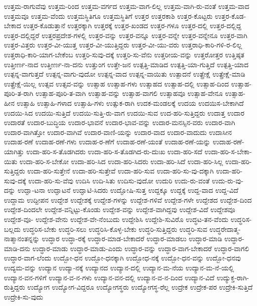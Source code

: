 {ಉತ್ತಮ-ರಾಗುವೆವು
ಉತ್ತಮ-ರಿಂದ
ಉತ್ತಮ-ವರ್ಗದ
ಉತ್ತಮ-ವಾಗ-ಲಿಲ್ಲ
ಉತ್ತಮ-ವಾಗಿ-ರು-ವಂತೆ
ಉತ್ತಮ-ವಾದ
ಉತ್ತಮವೂ
ಉತ್ತಮ-ವೆಂದು
ಉತ್ತಮಸ್ಥಿತಿಗೂ
ಉತ್ತಮಸ್ಥಿತಿಗೆ
ಉತ್ತರ
ಉತ್ತರಕಾಶಿ
ಉತ್ತರ-ಕೊಟ್ಟರು
ಉತ್ತರ-ಕೊಡ-ಬೇಕಾದ
ಉತ್ತರ-ಕೊಡುತ್ತಾನೆ
ಉತ್ತರಕ್ಕಾಗಿ
ಉತ್ತರಕ್ಕೆ
ಉತ್ತರ-ಖಂಡದ
ಉತ್ತರ-ಗಳೂ
ಉತ್ತರ-ದಲ್ಲಿ
ಉತ್ತರ-ದಲ್ಲಿದ್ದ
ಉತ್ತರ-ದಲ್ಲಿದ್ದರೆ
ಉತ್ತರಪ್ರದೇಶ-ಗಳಲ್ಲಿ
ಉತ್ತರ-ವನ್ನು
ಉತ್ತರ-ವನ್ನೂ
ಉತ್ತರ-ವನ್ನೇ
ಉತ್ತರ-ವನ್ನೇನೂ
ಉತ್ತರ-ವಾಗಿ
ಉತ್ತರ-ವಿತ್ತರು
ಉತ್ತರ-ವೀ-ಯುತ್ತ
ಉತ್ತರ-ವೀ-ಯುತ್ತಿದ್ದರು
ಉತ್ತರ-ವೀ-ಯು-ವರು
ಉತ್ತರಾಧಿ-ಕಾರಿ-ಗಳಿ-ರ-ಲಿಲ್ಲ
ಉತ್ತರಾಧಿ-ಕಾರಿ-ಯಾಗ-ಬೇಕೆಂಬ
ಉತ್ತರಿ-ಸುವು-ದಕ್ಕೆ
ಉತ್ತರಿ-ಸು-ವೆನು
ಉತ್ತರೀಯ-ವನ್ನು
ಉತ್ತರೋತ್ತರ
ಉತ್ತಿಷ್ಠತ
ಉತ್ತೀರ್ಣ-ನಾದ
ಉತ್ತೀರ್ಣ-ನಾ-ದನು
ಉತ್ತುಂಗ
ಉತ್ತೇ-ಜನ
ಉತ್ಪತ್ತಿ-ಮಾಡಿದ
ಉತ್ಪತ್ತಿ-ಯಾ-ಗುತ್ತಿದೆ
ಉತ್ಪತ್ತಿ-ಯಾದ
ಉತ್ಪನ್ನ-ವಾಗುತ್ತದೆ
ಉತ್ಪನ್ನ-ವಾಗು-ವುದೋ
ಉತ್ಪನ್ನ-ವಾದ
ಉತ್ಪನ್ನ-ವಾಯಿತು
ಉತ್ಪಾದನೆ
ಉತ್ಪ್ರೇಕ್ಷೆ
ಉತ್ಪ್ರೇಕ್ಷೆ-ಮಾಡಿ
ಉತ್ಪ್ರೇಕ್ಷೆ-ಯಿಲ್ಲ
ಉತ್ಸವ
ಉತ್ಸವ-ವನ್ನು
ಉತ್ಸಾಹ
ಉತ್ಸಾಹ-ಗಳು
ಉತ್ಸಾಹದ
ಉತ್ಸಾಹ-ದಲ್ಲಿ
ಉತ್ಸಾಹ-ದಿಂದ
ಉತ್ಸಾಹ-ಪೂರಿ-ತ-ರಾಗಿ
ಉತ್ಸಾಹ-ಪೂರಿ-ತ-ವಾಗಿ
ಉತ್ಸಾಹ-ವನ್ನು
ಉತ್ಸಾಹ-ವಾಗಲಿ
ಉತ್ಸಾಹವೂ
ಉತ್ಸಾಹ-ವೇನೂ
ಉತ್ಸಾಹ-ಹೀನ
ಉತ್ಸಾಹಿ
ಉತ್ಸಾಹಿ-ಗಳಾದ
ಉತ್ಸಾಹಿ-ಗಳು
ಉತ್ಸುಕ-ರಾಗಿ
ಉದಕ-ಮಂಡಲಕ್ಕೆ
ಉದಯ
ಉದಯಿಸ-ಬೇಕಾಗಿದೆ
ಉದಯಿ-ಸಿದ
ಉದಯಿ-ಸುತ್ತಿದೆ
ಉದಯಿ-ಸುತ್ತಿ-ರು-ವಾಗ
ಉದಯಿ-ಸುವ
ಉದ-ಹರಿ-ಸುತ್ತಿದ್ದರು
ಉದಾತ್ತ
ಉದಾರ
ಉದಾರತೆ
ಉದಾರ-ಬುದ್ಧಿಯ
ಉದಾರ-ಭಾವನೆ
ಉದಾರ-ಭಾವ-ವನ್ನು
ಉದಾರ-ಮನಸ್ಸಿನ-ವರು
ಉದಾರ-ವಾಗಿ
ಉದಾರ-ವಾಗಿತ್ತೋ
ಉದಾರ-ವಾಗಿವೆ
ಉದಾರ-ವಾಣಿ-ಯನ್ನು
ಉದಾರ-ವಾದ
ಉದಾರ-ವಾದುದು
ಉದಾಸೀನ
ಉದಾಹ-ರಣೆ
ಉದಾಹ-ರಣೆ-ಗಳು
ಉದಾಹ-ರ-ಣೆಗೆ
ಉದಾಹ-ರಣೆ-ಯಂತೆ
ಉದಾಹ-ರಣೆ-ಯನ್ನು
ಉದಾಹ-ರಣೆ-ಯಾಗಿತ್ತು
ಉದಾ-ಹರಿ-ಸ-ತೊಡಗಿದರು
ಉದಾ-ಹರಿ-ಸ-ತೊಡಗಿದ-ರು-ದುಃಖ
ಉದಾ-ಹರಿ-ಸದೆ
ಉದಾ-ಹರಿ-ಸ-ಬೇಕಾ-ಯಿತು
ಉದಾ-ಹರಿ-ಸ-ಬೇಕೋ
ಉದಾ-ಹರಿ-ಸಿದ
ಉದಾ-ಹರಿ-ಸಿದರು
ಉದಾ-ಹರಿ-ಸಿದೆ
ಉದಾ-ಹರಿ-ಸಿಲ್ಲ
ಉದಾ-ಹರಿ-ಸುತ್ತಿದ್ದರು
ಉದಾ-ಹರಿ-ಸುತ್ತೇನೆ
ಉದಾ-ಹರಿ-ಸುತ್ತೇವೆ
ಉದಾ-ಹರಿ-ಸುವ
ಉದಾ-ಹರಿ-ಸು-ವು-ದಕ್ಕಾಗಿ
ಉದಾ-ಹರಿ-ಸುವು-ದಕ್ಕೆ
ಉದಾ-ಹರಿ-ಸು-ವೆವು
ಉದಿಸಿ
ಉದಿ-ಸಿತು
ಉದಿಸು-ವುದೋ
ಉದುರಿ
ಉದು-ರು-ವಂತೆ
ಉದು-ರು-ವು-ದನ್ನು
ಉದ್ಘಾ-ಟನಾ
ಉದ್ಘಾಟನೆ
ಉದ್ಘಾಟಿ-ಸಿದರು
ಉದ್ಘೋಷಿ-ಸುತ್ತ
ಉದ್ದಕ್ಕೂ
ಉದ್ದಕ್ಕೆ
ಉದ್ದ-ವಾದ
ಉದ್ದ-ವಿದೆ
ಉದ್ದಾಮ
ಉದ್ದೀಪನ
ಉದ್ದೇಶ
ಉದ್ದೇಶಕ್ಕೆ
ಉದ್ದೇಶ-ಗಳನ್ನು
ಉದ್ದೇಶ-ಗಳಿವೆ
ಉದ್ದೇಶ-ಗಳೇ
ಉದ್ದೇಶದ
ಉದ್ದೇಶ-ದಿಂದ
ಉದ್ದೇಶ-ದಿಂದಲೇ
ಉದ್ದೇಶ-ವನ್ನಿಟ್ಟು-ಕೊಂಡು
ಉದ್ದೇಶ-ವನ್ನು
ಉದ್ದೇಶ-ವಾಗಿದ್ದವು
ಉದ್ದೇಶ-ವಿದೆ
ಉದ್ದೇಶವೂ
ಉದ್ದೇಶ-ವೂ-
ಉದ್ದೇಶ-ವೇನು
ಉದ್ದೇಶ-ವೇ-ನೆಂಬುದು
ಉದ್ದೇಶಿಸಿ
ಉದ್ದೇಶಿ-ಸುವಿರೊ
ಉದ್ಧಟ-ತನ-ವೆಂದು
ಉದ್ಧರಿಸ-ಬಲ್ಲದು
ಉದ್ಧರಿಸ-ಬೇಕು
ಉದ್ಧರಿ-ಸಲು
ಉದ್ಧರಿಸಿ-ಕೊಳ್ಳ-ಬೇಕು
ಉದ್ಧರಿ-ಸುತ್ತಿದ್ದರು
ಉದ್ಧರಿ-ಸುವ
ಉದ್ಧರೇದಾತ್ಮ-ನಾತ್ಮಾನಂತನ್ನನ್ನು
ಉದ್ಧಾರ
ಉದ್ಧಾ-ರಕ್ಕೆ
ಉದ್ಧಾರ-ಮಾಡ-ಬೇಕಾದರೆ
ಉದ್ಧಾರ-ಮಾಡಲು
ಉದ್ಧಾರ-ಮಾಡಿ
ಉದ್ಧಾರ-ಮಾಡಿ-ದನು
ಉದ್ಧಾರ-ಮಾಡು
ಉದ್ಧಾರ-ಮಾಡು-ಎಂದು
ಉದ್ಧಾರ-ವನ್ನು
ಉದ್ಧಾರ-ವಾಗ-ಬೇಕಾದರೆ
ಉದ್ಧಾರ-ವಾಗಲಿ
ಉದ್ಧಾರ-ವಾಗ-ಲೆಂದು
ಉದ್ಬೋ-ಧನ
ಉದ್ಬೋ-ಧನಕ್ಕಾಗಿ
ಉದ್ಬೋಧ-ನಕ್ಕೆ
ಉದ್ಬೋ-ಧನ-ವನ್ನು
ಉದ್ಬೋ-ಧನವು
ಉದ್ಯಮ-ವನ್ನು
ಉದ್ಯಾನ
ಉದ್ಯಾ-ನಕ್ಕೆ
ಉದ್ಯಾನದ
ಉದ್ಯಾನ-ದಲ್ಲಿ
ಉದ್ಯಾನ-ಮ-ನೆಯ
ಉದ್ಯಾನ-ಮ-ನೆ-ಯಲ್ಲಿ
ಉದ್ಯಾನ-ವನ-ಗಳಿಗೆ
ಉದ್ಯಾನ-ವ-ನ-ಗಳು
ಉದ್ಯಾನ-ವನ-ದಲ್ಲಿ
ಉದ್ಯಾನ-ವ-ನ-ದಿಂದ
ಉದ್ಯಾನ-ವಿದೆ
ಉದ್ಯುಕ್ತ-ರಾಗಿ-ರುತ್ತಿದ್ದರು
ಉದ್ಯೋಗ
ಉದ್ಯೋಗ-ವಿದ್ದರೂ
ಉದ್ಯೋಗಸ್ಥರು
ಉದ್ಯೋಗಸ್ಥ-ರೆಲ್ಲ
ಉದ್ರೇಕ
ಉದ್ರೇಕ-ಪರ
ಉದ್ರೇಕಿ-ಸುತ್ತಿದೆ
ಉದ್ರೇಕಿ-ಸು-ವುದು
}
